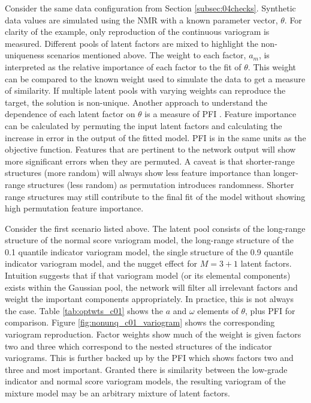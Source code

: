 Consider the same data configuration from Section \ref{subsec:04checks}. Synthetic data values are simulated using the \gls{NMR} with a known parameter vector, $\theta$. For clarity of the example, only reproduction of the continuous variogram is measured. Different pools of latent factors are mixed to highlight the non-uniqueness scenarios mentioned above. The weight to each factor, $a_{m}$, is interpreted as the relative importance of each factor to the fit of $\theta$. This weight can be compared to the known weight used to simulate the data to get a measure of similarity. If multiple latent pools with varying weights can reproduce the target, the solution is non-unique. Another approach to understand the dependence of each latent factor on $\theta$ is a measure of \gls{PFI} \citep{fisher2019all}. Feature importance can be calculated by permuting the input latent factors and calculating the increase in error in the output of the fitted model. \gls{PFI} is in the same units as the objective function. Features that are pertinent to the network output will show more significant errors when they are permuted. A caveat is that shorter-range structures (more random) will always show less feature importance than longer-range structures (less random) as permutation introduces randomness. Shorter range structures may still contribute to the final fit of the model without showing high permutation feature importance.

Consider the first scenario listed above. The latent pool consists of the long-range structure of the normal score variogram model, the long-range structure of the 0.1 quantile indicator variogram model, the single structure of the 0.9 quantile indicator variogram model, and the nugget effect for $M = 3+1$ latent factors.  Intuition suggests that if that variogram model (or its elemental components) exists within the Gaussian pool, the network will filter all irrelevant factors and weight the important components appropriately. In practice, this is not always the case. Table \ref{tab:optwts_c01} shows the $a$ and $\omega$ elements of $\theta$, plus \gls{PFI} for comparison. Figure \ref{fig:nonunq_c01_variogram} shows the corresponding variogram reproduction. Factor weights show much of the weight is given factors two and three which correspond to the nested structures of the indicator variograms. This is further backed up by the \gls{PFI} which shows factors two and three and most important. Granted there is similarity between the low-grade indicator and normal score variogram models, the resulting variogram of the mixture model may be an arbitrary mixture of latent factors.

